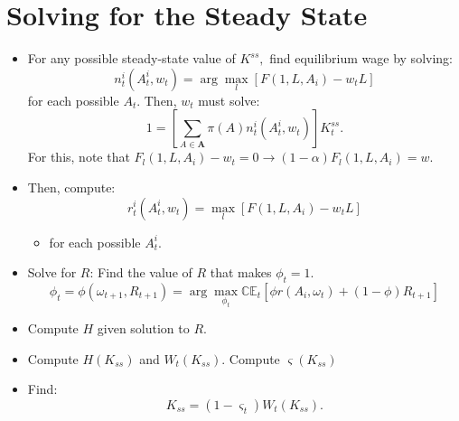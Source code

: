 \documentclass{article}
\begin{document}
\section{Solving for the Steady State}

\begin{itemize}
\item For any possible steady-state value of $K^{ss},$ find equilibrium wage
by solving:%
\begin{equation*}
n_{t}^{i}\left( A_{t}^{i},w_{t}\right) =\arg \max_{l}\left[ F\left(
1,L,A_{i}\right) -w_{t}L\right]
\end{equation*}%
for each possible $A_{t}$. Then, $w_{t}$ must solve:%
\begin{equation*}
1=\left[ \sum_{A\in \mathbf{A}}\pi \left( A\right) n_{t}^{i}\left(
A_{t}^{i},w_{t}\right) \right] K_{t}^{ss}.
\end{equation*}%
For this, note that $F_{l}\left( 1,L,A_{i}\right) -w_{t}=0\rightarrow \left(
1-\alpha \right) F_{l}\left( 1,L,A_{i}\right) =w.$

\item Then, compute:%
\begin{equation*}
r_{t}^{i}\left( A_{t}^{i},w_{t}\right) =\max_{l}\left[ F\left(
1,L,A_{i}\right) -w_{t}L\right]
\end{equation*}

\begin{itemize}
\item for each possible $A_{t}^{i}.$
\end{itemize}

\item Solve for $R$: Find the value of $R$ that makes $\phi _{t}=1.$
\begin{equation*}
\phi _{t}=\phi \left( \omega _{t+1},R_{t+1}\right) =\arg \max_{\phi _{t}}%
\mathbb{CE}_{t}\left[ \phi r\left( A_{i},\omega _{t}\right) +\left( 1-\phi
\right) R_{t+1}\right]
\end{equation*}

\item Compute $H$ given solution to $R$.

\item Compute $H\left( K_{ss}\right) $ and $W_{t}\left( K_{ss}\right) $.
Compute $\varsigma \left( K_{ss}\right) $

\item Find:%
\begin{equation*}
K_{ss}=\left( 1-\varsigma _{t}\right) W_{t}\left( K_{ss}\right) .
\end{equation*}
\end{itemize}
\end{document}
